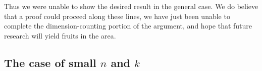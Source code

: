 \documentclass{article}
\begin{document}
Thus we were unable to show the desired result in the general case.  We do believe that a proof could proceed along these lines, we have just been unable to complete the dimension-counting portion of the argument, and hope that future research will yield fruits in the area.

\subsection{The case of small \boldmath$n$ and \boldmath$k$}


\end{document}
